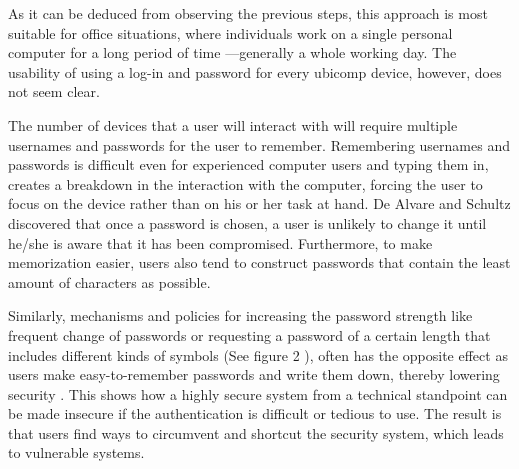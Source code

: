\documentclass{article}
\begin{document}
As it can be deduced from observing the previous steps, this approach is most suitable for office situations, where individuals work on a single personal computer for a long period of time ---generally a whole working day. The usability of using a log-in and password for every ubicomp device, however, does not seem clear. 

The number of devices that a user will interact with will require multiple usernames and passwords for the user to remember. Remembering usernames and passwords is difficult even for experienced computer users and typing them in, creates a breakdown in the interaction with the computer, forcing the user to focus on the device rather than on his or her task at hand.  De Alvare and Schultz\cite{dealvare1988framework} discovered that once a password is chosen, a user is unlikely to change it until he/she is aware that it has been compromised. Furthermore, to make memorization easier, users also tend to construct passwords that contain the least amount of characters as possible.

Similarly, mechanisms and policies for increasing the password strength like frequent change of passwords or requesting a password of a certain length that includes different kinds of symbols (See figure 2 ), often has the opposite effect as users make easy-to-remember passwords and write them down, thereby lowering security \cite{adams1999users}. This shows how a highly secure system from a technical standpoint can be made insecure if the authentication is difficult or tedious to use. The result is that users find ways to circumvent and shortcut the security system, which leads to vulnerable systems. 
\end{document}
